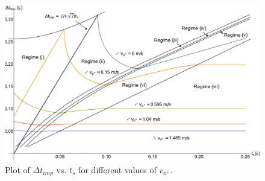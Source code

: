 \documentclass[letterpaper, 10 pt, conference]{ieeeconf}  %
\begin{document}
\begin{figure}
	\includegraphics[width=\linewidth]{deltVsts_differentVop.pdf}
	\caption[Variation of time between impacts with switching time for partially closed-loop control]{Plot of $\Delta t_{imp}$ vs. $t_s$ for different values of $v_{o^+}$.}
	\label{delTvsTs}
	\vspace{-0.5em}
\end{figure}
\end{document}

